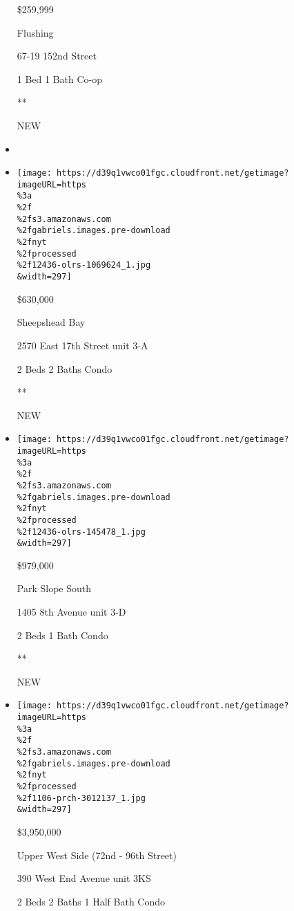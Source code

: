 \begin{itemize}
  \$259,999

  Flushing

  67-19 152nd Street

  1 Bed \textbar{} 1 Bath \textbar{} Co-op

  **

  NEW
\item
\item
  \href{/real-estate/usa/ny/brooklyn/sheepshead-bay/homes-for-sale/2570-east-17th-street/12436-OLRS-1069624?}{}

  \texttt{[image: https://d39q1vwco01fgc.cloudfront.net/getimage?imageURL=https\\\%3a\\\%2f\\\%2fs3.amazonaws.com\\\%2fgabriels.images.pre-download\\\%2fnyt\\\%2fprocessed\\\%2f12436-olrs-1069624\_1.jpg\\\&width=297]}

  \$630,000

  Sheepshead Bay

  2570 East 17th Street unit 3-A

  2 Beds \textbar{} 2 Baths \textbar{} Condo

  **

  NEW
\item
  \href{/real-estate/usa/ny/brooklyn/park-slope-south/homes-for-sale/1405-8th-avenue/12436-OLRS-145478?}{}

  \texttt{[image: https://d39q1vwco01fgc.cloudfront.net/getimage?imageURL=https\\\%3a\\\%2f\\\%2fs3.amazonaws.com\\\%2fgabriels.images.pre-download\\\%2fnyt\\\%2fprocessed\\\%2f12436-olrs-145478\_1.jpg\\\&width=297]}

  \$979,000

  Park Slope South

  1405 8th Avenue unit 3-D

  2 Beds \textbar{} 1 Bath \textbar{} Condo

  **

  NEW
\item
  \href{/real-estate/usa/ny/new-york/upper-west-side-72nd---96th-street/homes-for-sale/390-west-end-avenue/1106-PRCH-3012137?}{}

  \texttt{[image: https://d39q1vwco01fgc.cloudfront.net/getimage?imageURL=https\\\%3a\\\%2f\\\%2fs3.amazonaws.com\\\%2fgabriels.images.pre-download\\\%2fnyt\\\%2fprocessed\\\%2f1106-prch-3012137\_1.jpg\\\&width=297]}

  \$3,950,000

  Upper West Side (72nd - 96th Street)

  390 West End Avenue unit 3KS

  2 Beds \textbar{} 2 Baths \textbar{} 1 Half Bath \textbar{} Condo


\end{itemize}

